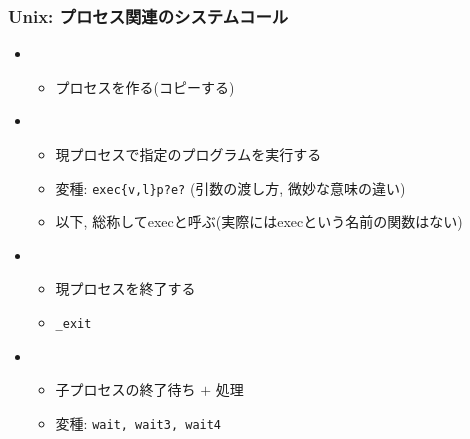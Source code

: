 \documentclass[12pt,dvipdfmx]{beamer}
\begin{document}
\begin{frame}
\frametitle{Unix: プロセス関連のシステムコール}
\begin{itemize}
\item {}
  \begin{itemize}
  \item プロセスを作る(コピーする)
  \end{itemize}
\item {} 
  \begin{itemize}
  \item 現プロセスで指定のプログラムを実行する
  \item 変種: {\tt exec\{v,l\}p?e?} (引数の渡し方, 微妙な意味の違い)
  \item 以下, 総称してexecと呼ぶ(実際にはexecという名前の関数はない)
  \end{itemize}
\item {}
  \begin{itemize}
  \item 現プロセスを終了する
  \item {\tt \_exit}
  \end{itemize}
\item {}
  \begin{itemize}
  \item 子プロセスの終了待ち $+$ 処理
  \item 変種: {\tt wait, wait3, wait4}
  \end{itemize}
\end{itemize}
\end{frame}
  
\end{document}

